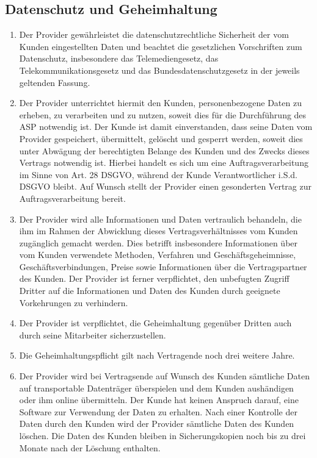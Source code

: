 \documentclass{terms}
\begin{document}
\subsection{Datenschutz und Geheimhaltung}
\begin{enumerate}
\item Der Provider gewährleistet die datenschutzrechtliche Sicherheit der vom Kunden eingestellten Daten und beachtet die gesetzlichen Vorschriften zum Datenschutz, insbesondere das Telemediengesetz, das Telekommunikationsgesetz und das Bundesdatenschutzgesetz in der jeweils geltenden Fassung.
\item Der Provider unterrichtet hiermit den Kunden, personenbezogene Daten zu erheben, zu verarbeiten und zu nutzen, soweit dies für die Durchführung des ASP notwendig ist. Der Kunde ist damit einverstanden, dass seine Daten vom Provider gespeichert, übermittelt, gelöscht und gesperrt werden, soweit dies unter Abwägung der berechtigten Belange des Kunden und des Zwecks dieses Vertrags notwendig ist. Hierbei handelt es sich um eine Auftragsverarbeitung im Sinne von Art. 28 DSGVO, während der Kunde Verantwortlicher i.S.d. DSGVO bleibt. Auf Wunsch stellt der Provider einen gesonderten Vertrag zur Auftragsverarbeitung bereit.
\item Der Provider wird alle Informationen und Daten vertraulich behandeln, die ihm im Rahmen der Abwicklung dieses Vertragsverhältnisses vom Kunden zugänglich gemacht werden. Dies betrifft insbesondere Informationen über vom Kunden verwendete Methoden, Verfahren und Geschäftsgeheimnisse, Geschäftsverbindungen, Preise sowie Informationen über die Vertragspartner des Kunden. Der Provider ist ferner verpflichtet, den unbefugten Zugriff Dritter auf die Informationen und Daten des Kunden durch geeignete Vorkehrungen zu verhindern.
\item Der Provider ist verpflichtet, die Geheimhaltung gegenüber Dritten auch durch seine Mitarbeiter sicherzustellen.
\item Die Geheimhaltungspflicht gilt nach Vertragende noch drei weitere Jahre. 
\item Der Provider wird bei Vertragsende auf Wunsch des Kunden sämtliche Daten auf transportable Datenträger überspielen und dem Kunden aushändigen oder ihm online übermitteln. Der Kunde hat keinen Anspruch darauf, eine Software zur Verwendung der Daten zu erhalten. Nach einer Kontrolle der Daten durch den Kunden wird der Provider sämtliche Daten des Kunden löschen. Die Daten des Kunden bleiben in Sicherungskopien noch bis zu drei Monate nach der Löschung enthalten.
\end{enumerate}
\end{document}
